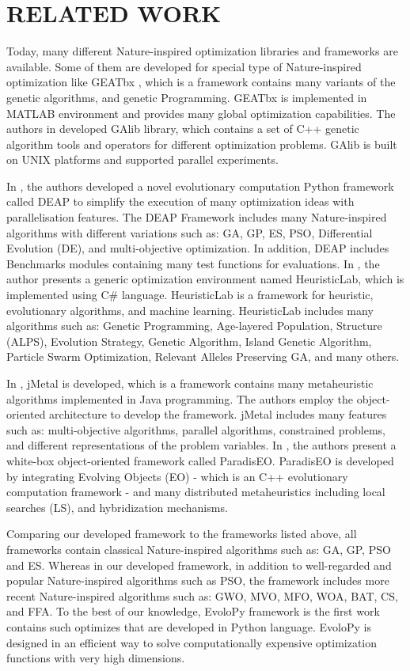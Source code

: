 \documentclass[a4paper,twoside]{article}
\begin{document}
\section{\uppercase{Related Work}}
Today, many different Nature-inspired optimization libraries and frameworks are available. Some of them are developed for special type of Nature-inspired optimization like GEATbx \cite{GEATbx}, which is a framework contains many variants of the genetic algorithms, and genetic Programming. GEATbx is implemented in MATLAB environment and provides many global optimization capabilities. The authors in \cite {GAlib} developed GAlib library, which contains a set of C++ genetic algorithm tools and operators for different optimization problems. GAlib is built on UNIX platforms and supported parallel experiments. 

In \cite {DEAP_JMLR2012}, the authors developed a novel evolutionary computation Python framework called DEAP to simplify the execution of many optimization ideas with  parallelisation features. The DEAP Framework includes many Nature-inspired algorithms with different variations such as: GA, GP, ES, PSO, Differential Evolution (DE), and multi-objective optimization. In addition, DEAP includes Benchmarks modules containing many test functions for evaluations. In \cite{Wagner04}, the author presents a generic optimization environment named HeuristicLab, which is implemented using C\# language. HeuristicLab is a framework for heuristic, evolutionary algorithms, and machine learning. HeuristicLab includes many algorithms such as: Genetic Programming, Age-layered Population, Structure (ALPS), Evolution Strategy, Genetic Algorithm, Island Genetic Algorithm, Particle Swarm Optimization, Relevant Alleles Preserving GA, and many others. 

In \cite{Durillo2011}, jMetal is developed, which is a framework contains many metaheuristic algorithms implemented in Java programming. The authors employ the object-oriented architecture to develop the framework. jMetal includes many features such as: multi-objective algorithms, parallel algorithms, constrained problems, and different representations of the problem variables. In \cite{Cahon2004,humeau13}, the authors present a white-box object-oriented framework called ParadisEO. ParadisEO is developed by integrating Evolving Objects (EO) - which is an C++ evolutionary computation framework - and many distributed metaheuristics including local searches (LS), and hybridization mechanisms.  

Comparing our developed framework to the frameworks listed above, all
frameworks contain classical Nature-inspired algorithms such as: GA,
GP, PSO and ES. Whereas in our developed framework, in addition to
well-regarded and popular Nature-inspired algorithms such as PSO, the
framework includes more recent Nature-inspired algorithms such as:
GWO, MVO, MFO, WOA, BAT, CS, and FFA. To the best of our knowledge,
EvoloPy framework is the first work contains such optimizes that are
developed in Python language. EvoloPy is designed in an efficient way
to solve computationally expensive optimization functions with very
high dimensions. 
\end{document}
